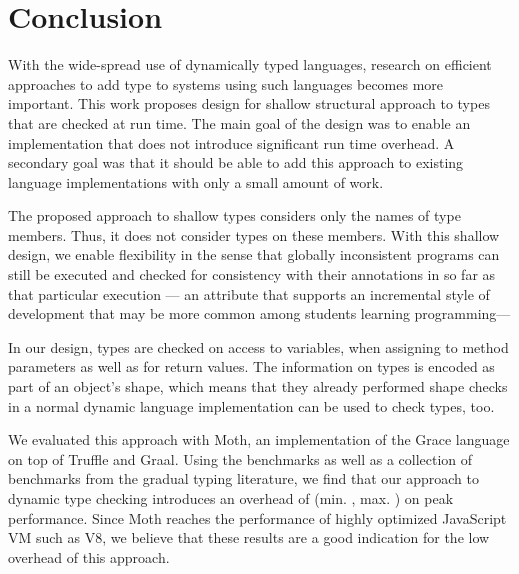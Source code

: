 
\section{Conclusion}
\label{sec:conclusion}

With the wide-spread use of dynamically typed languages,
research on efficient approaches to add type to systems using such languages
becomes more important.
%
This work proposes design for shallow structural approach to types
that are checked at run time.
The main goal of the design was to enable an implementation that
does not introduce significant run time overhead.
A secondary goal was that it should be able to add this approach to
existing language implementations with only a small amount of work.


The proposed approach to shallow types considers only the names of type members.
Thus, it does not consider types on these members.
With this shallow design, we enable flexibility in the sense that
globally inconsistent programs can still be executed and
checked for consistency with their annotations in so far as
that particular execution%
--- an attribute that supports an incremental style of development
that may be more common among students learning programming---%

In our design, types are checked on access to variables,
when assigning to method parameters as well as for return values.
The information on types is encoded as part of an object's shape,
which means that they already performed shape checks in a normal dynamic
language implementation can be used to check types, too.

We evaluated this approach with Moth, an implementation of the Grace language
on top of Truffle and Graal.
Using the \AWFY benchmarks as well as a collection of benchmarks from the
gradual typing literature, we find that our approach to dynamic type checking
introduces an overhead of 
\OverheadTypingGMeanP (min. \OverheadTypingMinP, max. \OverheadTypingMaxP)
on peak performance.
Since Moth reaches the performance of highly optimized JavaScript VM such as V8,
we believe that these results are a good indication for the low overhead of this
approach.

